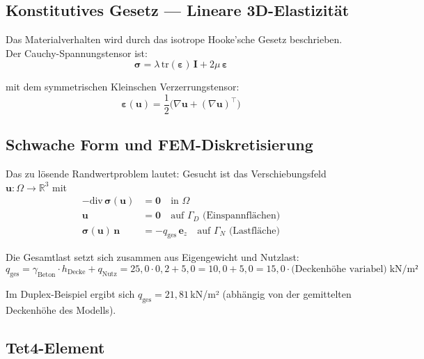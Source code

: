 \documentclass[a4paper,11pt]{article}
\begin{document}
\subsection{Konstitutives Gesetz — Lineare 3D-Elastizität}

Das Materialverhalten wird durch das isotrope Hooke'sche Gesetz beschrieben. Der Cauchy-Spannungstensor ist:
\begin{equation}
  \boldsymbol{\sigma} = \lambda\,\mathrm{tr}(\boldsymbol{\varepsilon})\,\mathbf{I} + 2\mu\,\boldsymbol{\varepsilon}
  \label{eq:hooke}
\end{equation}

mit dem symmetrischen Kleinschen Verzerrungstensor:
\begin{equation}
  \boldsymbol{\varepsilon}(\mathbf{u}) = \frac{1}{2}\bigl(\nabla\mathbf{u} + (\nabla\mathbf{u})^\top\bigr)
\end{equation}

\subsection{Schwache Form und FEM-Diskretisierung}

Das zu lösende Randwertproblem lautet: Gesucht ist das Verschiebungsfeld $\mathbf{u}: \Omega \to \mathbb{R}^3$ mit
\begin{align}
  -\mathrm{div}\,\boldsymbol{\sigma}(\mathbf{u}) &= \mathbf{0} \quad \text{in } \Omega \\
  \mathbf{u} &= \mathbf{0} \quad \text{auf } \Gamma_D \text{ (Einspannflächen)} \\
  \boldsymbol{\sigma}(\mathbf{u})\,\mathbf{n} &= -q_\text{ges}\,\mathbf{e}_z \quad \text{auf } \Gamma_N \text{ (Lastfläche)}
\end{align}

Die Gesamtlast setzt sich zusammen aus Eigengewicht und Nutzlast:
\begin{equation}
  q_\text{ges} = \gamma_\text{Beton} \cdot h_\text{Decke} + q_\text{Nutz}
  = 25{,}0 \cdot 0{,}2 + 5{,}0 = 10{,}0 + 5{,}0 = 15{,}0 \cdot \text{(Deckenhöhe variabel)}\;\text{kN/m²}
\end{equation}

Im Duplex-Beispiel ergibt sich $q_\text{ges} = 21{,}81$\,kN/m² (abhängig von der gemittelten Deckenhöhe des Modells).

\subsection{Tet4-Element}
\end{document}
